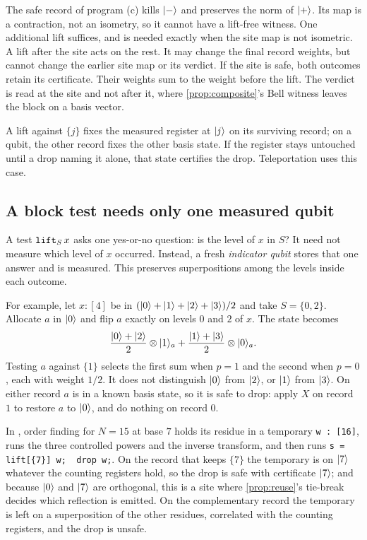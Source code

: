 \documentclass[acmsmall,screen,review,anonymous,nonacm]{acmart}
\begin{document}
The safe record of program (c) kills $\lvert - \rangle$ and preserves the norm
of $\lvert + \rangle$. Its map is a contraction, not an isometry, so it cannot have
a lift-free witness. One additional lift suffices, and is needed exactly
when the site map is not isometric.
A lift after the site acts on the rest. It may change the final record
weights, but cannot change the earlier site map or its verdict. If the site
is safe, both outcomes retain its certificate. Their weights sum to the
weight before the lift. The verdict is read at the site and not after
it, where \cref{prop:composite}'s Bell witness leaves the block on a basis vector.

\stmtRecordWitness

\stmtObsInvRecord

A lift against $\{j\}$ fixes the measured register at $\lvert j \rangle$ on
its surviving record; on a qubit, the other record fixes the other basis
state. If the register stays untouched until a drop naming it alone,
that state certifies the drop. Teleportation uses this case.

\subsection{A block test needs only one measured qubit}\label{sec:block-test}

A test $\texttt{lift}_S\,x$ asks one yes-or-no question: is the level of $x$
in $S$? It need not measure which level of $x$ occurred. Instead, a
fresh \emph{indicator qubit} stores that one answer and is measured.
This preserves superpositions among the levels inside each outcome.

For example, let $x:[4]$ be in
$(\lvert 0 \rangle+\lvert 1 \rangle+\lvert 2 \rangle+\lvert 3 \rangle)/2$ and take $S=\{0,2\}$.
Allocate $a$ in $\lvert 0 \rangle$ and flip $a$ exactly on levels $0$ and $2$ of $x$.
The state becomes
\[
 \frac{\lvert 0 \rangle+\lvert 2 \rangle}{2}\otimes\lvert 1 \rangle_a
 +\frac{\lvert 1 \rangle+\lvert 3 \rangle}{2}\otimes\lvert 0 \rangle_a.
\]
Testing $a$ against $\{1\}$ selects the first sum when $p=1$ and the
second when $p=0$, each with weight $1/2$. It does not distinguish
$\lvert 0 \rangle$ from $\lvert 2 \rangle$, or $\lvert 1 \rangle$ from $\lvert 3 \rangle$.
On either record $a$ is in a known basis state, so it is safe to drop:
apply $X$ on record $1$ to restore $a$ to $\lvert 0 \rangle$, and do nothing on record $0$.

\stmtBlockLift

In , order finding for $N=15$ at base $7$ holds its residue in a temporary
\texttt{w : [16]}, runs the three controlled powers and the inverse
transform, and then runs
\texttt{s = lift[\{7\}] w;\ \ drop w;}.
On the record that keeps $\{7\}$ the temporary is on $\lvert 7 \rangle$ whatever the
counting registers hold, so the drop is safe with certificate $\lvert 7 \rangle$; and
because $\lvert 0 \rangle$ and $\lvert 7 \rangle$ are orthogonal, this is a site where
\cref{prop:reuse}'s tie-break decides which reflection is emitted. On the
complementary record the temporary is left on a superposition of the other
residues, correlated with the counting registers, and the drop is unsafe.
\end{document}
